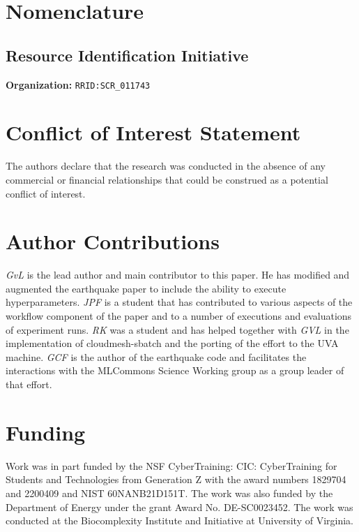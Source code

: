 \documentclass[utf8]{FrontiersinVancouver} %
\begin{document}

\section{Nomenclature}

\subsection{Resource Identification Initiative}

{\bf Organization:} \verb|RRID:SCR_011743|

\section*{Conflict of Interest Statement}

The authors declare that the research was conducted in the absence of
any commercial or financial relationships that could be construed as a
potential conflict of interest.

\section*{Author Contributions}

{\em GvL} is the lead author and main contributor to this paper. He
has modified and augmented the earthquake paper to include the ability
to execute hyperparameters. {\em JPF} is a student that has
contributed to various aspects of the workflow component of the paper
and to a number of executions and evaluations of experiment runs. {\em
  RK} was a student and has helped together with {\em GVL} in the
implementation of cloudmesh-sbatch and the porting of the effort to
the UVA machine.  {\em GCF} is the author of the earthquake code and
facilitates the interactions with the MLCommons Science Working group
as a group leader of that effort.

\section*{Funding}

Work was in part funded by the NSF CyberTraining: CIC: CyberTraining
for Students and Technologies from Generation Z with the award numbers
1829704 and 2200409 and NIST 60NANB21D151T.  The work was also funded
by the Department of Energy under the grant Award
No. DE-SC0023452. The work was conducted at the Biocomplexity
Institute and Initiative at University of Virginia.
\end{document}
